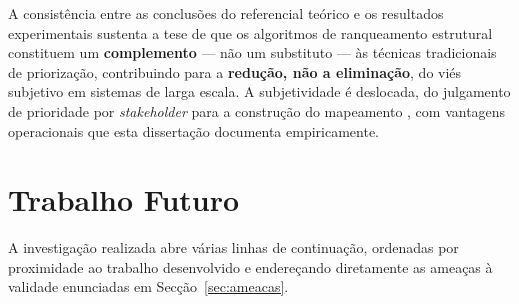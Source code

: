 A consistência entre as conclusões do referencial teórico e os
resultados experimentais sustenta a tese de que os algoritmos de
ranqueamento estrutural constituem um \textbf{complemento} --- não
um substituto --- às técnicas tradicionais de priorização,
contribuindo para a \textbf{redução, não a eliminação}, do viés
subjetivo em sistemas de larga escala. A subjetividade é deslocada,
do julgamento de prioridade por \emph{stakeholder} para a
construção do mapeamento , com vantagens
operacionais que esta dissertação documenta empiricamente.

\section{Trabalho Futuro}
\label{sec:trabalho-futuro}

A investigação realizada abre várias linhas de continuação,
ordenadas por proximidade ao trabalho desenvolvido e endereçando
diretamente as ameaças à validade enunciadas em
Secção~\ref{sec:ameacas}.

